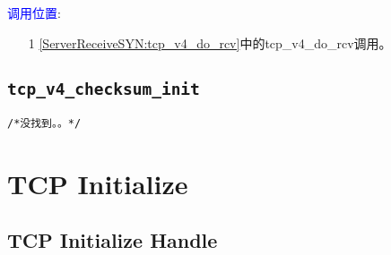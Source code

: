             \textcolor{blue}{调用位置}:

                \begin{enumerate}
                    \item[1]        \ref{ServerReceiveSYN:tcp_v4_do_rcv}中的tcp\_v4\_do\_rcv调用。
                \end{enumerate}
            
    \subsection{\texttt{tcp_v4_checksum_init}}
\begin{verbatim}
/*没找到。。*/
\end{verbatim}

\section{TCP Initialize}
    \subsection{TCP Initialize Handle}
